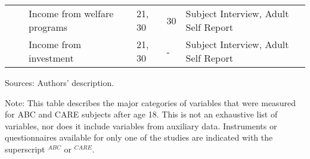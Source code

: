 \begin{sidewaystable}[H]
\begin{threeparttable}
\begin{tabular}{L{3.5cm} C{3.5cm} C{5cm} C{1.5cm} C{1.5cm} C{6cm}}
	&		&	Income from welfare programs	&	21, 30	&	30	&	Subject Interview, Adult Self Report	\\
	&		&	Income from investment	&	21, 30	&	-	&	Subject Interview, Adult Self Report	\\
\midrule											
 \hline \hline
\end{tabular}										
\begin{tablenotes}									
\scriptsize											
\item Sources: Authors' description. \\				
\item Note: This table describes the major categories of variables that were measured for ABC and CARE subjects after age 18. This is not an exhaustive list of variables, nor does it include variables from auxiliary data. Instruments or questionnaires available for only one of the studies are indicated with the superscript $^{ABC}$ or $^{CARE}$.			
\end{tablenotes}									
\end{threeparttable}								
\end{sidewaystable}											
